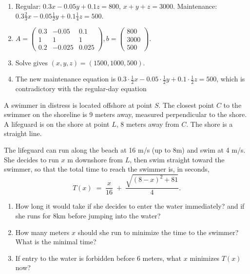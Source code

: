 \documentclass[11pt]{exam}
\begin{document}
\begin{questions}
\begin{solution}
\begin{enumerate}[label=(\alph*)]
  \item Regular: $0.3x-0.05y+0.1z=800$, $x+y+z=3000$.
    Maintenance: $0.3\tfrac23x-0.05\tfrac12y+0.1\tfrac14z=500$.
  \item $A=\begin{pmatrix}0.3&-0.05&0.1\\1&1&1\\0.2&-0.025&0.025\end{pmatrix},
    b=\begin{pmatrix}800\\3000\\500\end{pmatrix}.$
  \item Solve gives $(x,y,z)=(1500,1000,500)$.
  \item The new maintenance equation is $0.3\cdot\tfrac12x-0.05\cdot\tfrac12y+0.1\cdot\tfrac12z=500$, which is contradictory with the regular-day equation
\end{enumerate}
\end{solution}

\question[3]
A swimmer in distress is located offshore at point $S$. The closest point $C$ to the swimmer on the shoreline is 9 meters away, measured perpendicular to the shore. A lifeguard is on the shore at point \(L\), 8 meters away from $C$. The shore is a straight line.

The lifeguard can run along the beach at 16 m/s (up to 8m) and swim at 4 m/s. She decides to run \(x\) m downshore from \(L\), then swim straight toward the swimmer, so that the total time to reach the swimmer is, in seconds,
\[
T(x) \;=\; \frac{x}{16} \;+\; \frac{\sqrt{(8 - x)^2 + 81}}{4}.
\]

\begin{enumerate}[label=(\alph*)]
  \item How long it would take if she decides to enter the water immediately? and if she runs for $8$km before jumping into the water?
  \item How many meters \(x\) should she run to minimize the time to the swimmer? What is the minimal time?
  \item If entry to the water is forbidden before $6$ meters, what $x$ minimizes $T(x)$ now?
\end{enumerate}


\end{questions}
\end{document}
